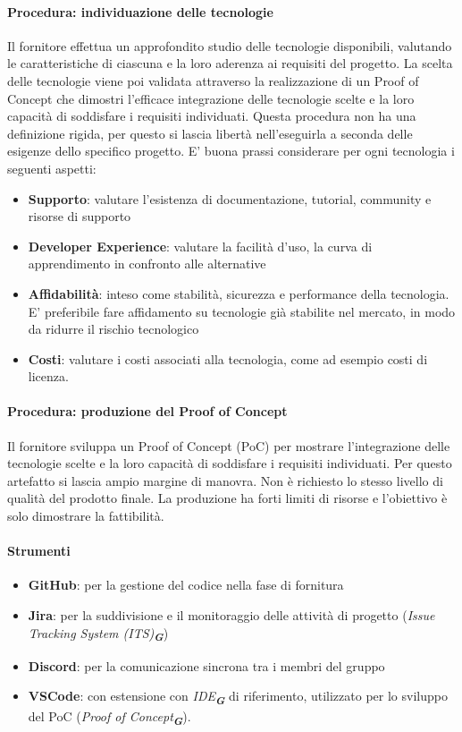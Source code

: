 \documentclass[a4paper,12pt]{article}
\newcommand{\glossario}[1]{\textit{#1}\textsubscript{\textbf{\textit{\textcolor{lightblack}{G}}}}}
\begin{document}
\paragraph{Procedura: individuazione delle tecnologie}
Il fornitore effettua un approfondito studio delle tecnologie disponibili, valutando le caratteristiche di ciascuna e la loro aderenza ai requisiti del progetto. La scelta delle tecnologie viene poi validata attraverso la realizzazione di un Proof of Concept che dimostri l'efficace integrazione delle tecnologie scelte e la loro capacità di soddisfare i requisiti individuati.
Questa procedura non ha una definizione rigida, per questo si lascia libertà nell'eseguirla a seconda delle esigenze dello specifico progetto. E' buona prassi considerare per ogni tecnologia i seguenti aspetti:
\begin{itemize}
    \item \textbf{Supporto}: valutare l'esistenza di documentazione, tutorial, community e risorse di supporto
    \item \textbf{Developer Experience}: valutare la facilità d'uso, la curva di apprendimento in confronto alle alternative
    \item \textbf{Affidabilità}: inteso come stabilità, sicurezza e performance della tecnologia. E' preferibile fare affidamento su tecnologie già stabilite nel mercato, in modo da ridurre il rischio tecnologico
    \item \textbf{Costi}: valutare i costi associati alla tecnologia, come ad esempio costi di licenza.
\end{itemize}

\paragraph{Procedura: produzione del Proof of Concept}
Il fornitore sviluppa un Proof of Concept (PoC) per mostrare l'integrazione delle tecnologie scelte e la loro capacità di soddisfare i requisiti individuati.
Per questo artefatto si lascia ampio margine di manovra. Non è richiesto lo stesso livello di qualità del prodotto finale. La produzione ha forti limiti di risorse e l'obiettivo è solo dimostrare la fattibilità.

\paragraph{Strumenti}
\begin{itemize}
    \item \textbf{GitHub}: per la gestione del codice
          nella fase di fornitura
    \item \textbf{Jira}: per la suddivisione e il monitoraggio delle attività di progetto
          (\glossario{Issue Tracking System (ITS)})
    \item \textbf{Discord}: per la comunicazione sincrona tra i membri del gruppo
    \item \textbf{VSCode}: con estensione con \glossario{IDE} di riferimento, utilizzato per lo sviluppo del PoC (\glossario{Proof
              of Concept}).
\end{itemize}
\end{document}
